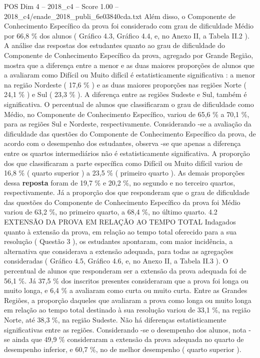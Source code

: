 \begin{textsample}{POS Dim 4 – 2018\_c4 – Score 1.00 – 2018\_c4/enade\_2018\_publi\_6e03840cda.txt}
Além disso, o Componente de Conhecimento Específico da prova foi considerado com grau de dificuldade Médio por 66,8 \% dos alunos ( Gráfico 4.3, Gráfico 4.4, e, no Anexo II, a Tabela II.2 ).
A análise das respostas dos estudantes quanto ao grau de dificuldade do Componente de Conhecimento Específico da prova, agregado por Grande Região, mostra que a diferença entre a menor e as duas maiores proporções de alunos que a avaliaram como Difícil ou Muito difícil é estatisticamente significativa : a menor na região Nordeste ( 17,6 \% ) e as duas maiores proporções nas regiões Norte ( 24,1 \% ) e Sul ( 23,3 \% ).
A diferença entre as regiões Sudeste e Sul, também é significativa.
O percentual de alunos que classificaram o grau de dificuldade como Médio, no Componente de Conhecimento Específico, variou de 65,6 \% a 70,1 \%, para as regiões Sul e Nordeste, respectivamente.
Considerando -se a avaliação da dificuldade das questões do Componente de Conhecimento Específico da prova, de acordo com o desempenho dos estudantes, observa -se que apenas a diferença entre os quartos intermediários não é estatisticamente significativa.
A proporção dos que classificaram a parte específica como Difícil ou Muito difícil variou de 16,8 \% ( quarto superior ) a 23,5 \% ( primeiro quarto ).
As demais proporções dessa \textbf{reposta} foram de 19,7 \% e 20,2 \%, no segundo e no terceiro quartos, respectivamente.
Já a proporção dos que responderam que o grau de dificuldade das questões do Componente de Conhecimento Específico da prova foi Médio variou de 63,2 \%, no primeiro quarto, a 68,4 \%, no último quarto. 4.2 EXTENSÃO DA PROVA EM RELAÇÃO AO TEMPO TOTAL Indagados quanto à extensão da prova, em relação ao tempo total oferecido para a sua resolução ( Questão 3 ), os estudantes apontaram, com maior incidência, a alternativa que considerava a extensão adequada, para todas as agregações consideradas ( Gráfico 4.5, Gráfico 4.6, e, no Anexo II, a Tabela II.3 ).
O percentual de alunos que responderam ser a extensão da prova adequada foi de 56,1 \%.
Já 37,5 \% dos inscritos presentes consideraram que a prova foi longa ou muito longa, e 6,4 \% a avaliaram como curta ou muito curta.
Entre as Grandes Regiões, a proporção daqueles que avaliaram a prova como longa ou muito longa em relação ao tempo total destinado à sua resolução variou de 33,1 \%, na região Norte, até 38,3 \%, na região Sudeste.
Não há diferenças estatisticamente significativas entre as regiões.
Considerando -se o desempenho dos alunos, nota -se ainda que 49,9 \% consideraram a extensão da prova adequada no quarto de desempenho inferior, e 60,7 \%, no de melhor desempenho ( quarto superior ).

\end{textsample}
